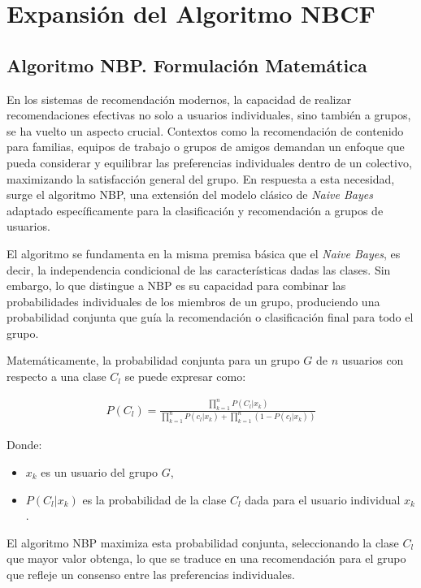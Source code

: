 \documentclass[twocolumn, fontsize=10pt]{article}
\begin{document}
\section{Expansión del Algoritmo NBCF}

\subsection{Algoritmo NBP. Formulación Matemática}
En los sistemas de recomendación modernos, la 
capacidad de realizar recomendaciones efectivas 
no solo a usuarios individuales, sino también a grupos, 
se ha vuelto un aspecto crucial. Contextos como la 
recomendación de contenido para familias, equipos de 
trabajo o grupos de amigos demandan un enfoque que 
pueda considerar y equilibrar las preferencias 
individuales dentro de un colectivo, maximizando la 
satisfacción general del grupo. En respuesta a esta 
necesidad, surge el algoritmo NBP, una extensión del 
modelo clásico de \textit{Naive Bayes} adaptado 
específicamente para la clasificación y recomendación 
a grupos de usuarios.

El algoritmo se fundamenta en la misma premisa básica 
que el \textit{Naive Bayes}, es decir, la independencia 
condicional de las características dadas las clases. 
Sin embargo, lo que distingue a NBP es su capacidad 
para combinar las probabilidades individuales de los 
miembros de un grupo, produciendo una probabilidad 
conjunta que guía la recomendación o clasificación 
final para todo el grupo.

Matemáticamente, la probabilidad conjunta para un 
grupo $G$ de $n$ usuarios con respecto a una clase $C_l$ 
se puede expresar como:

\begin{multline}
    P(C_l) = \frac{\prod_{k=1}^{n} P(C_l|x_k)}{\prod_{k=1}^{n} P(c_l|x_k) + \prod_{k=1}^{n} (1-P(c_l|x_k))}
\end{multline} \cite{nbp}

Donde:
\begin{itemize}
    \item $x_k$ es un usuario del grupo $G$,
    \item $P(C_l|x_k)$ es la probabilidad de la 
    clase $C_l$ dada para el usuario individual $x_k$. 
\end{itemize} 

El algoritmo NBP maximiza esta probabilidad conjunta, 
seleccionando la clase $C_l$ que mayor valor obtenga, 
lo que se traduce en una recomendación para el grupo 
que refleje un consenso entre las preferencias 
individuales.
\end{document}
